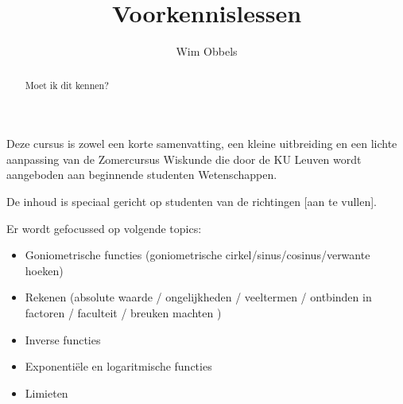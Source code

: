 \documentclass{ximera}
\author{Wim Obbels}
\title{Voorkennislessen}
\begin{document}
\begin{abstract}
	Moet ik dit kennen?
\end{abstract}
\maketitle


Deze cursus is zowel een korte samenvatting, een kleine uitbreiding en een lichte aanpassing van de Zomercursus Wiskunde die door de KU Leuven wordt aangeboden aan beginnende studenten Wetenschappen.

De inhoud is speciaal gericht op studenten van de richtingen [aan te vullen].

Er wordt gefocussed op volgende topics:

\begin{itemize}
    \item Goniometrische functies (goniometrische cirkel/sinus/cosinus/verwante hoeken)
    \item Rekenen (absolute waarde / ongelijkheden / veeltermen / ontbinden in factoren / faculteit / breuken machten )
    
    \item Inverse functies
    \item Exponentiële en logaritmische functies
    \item Limieten
\end{itemize}
\end{document}
